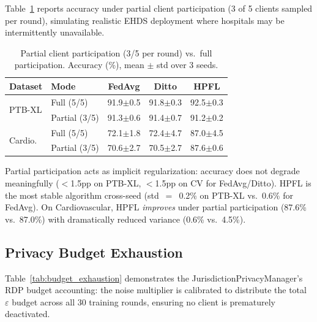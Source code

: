 \documentclass[conference,a4paper]{IEEEtran}
\begin{document}
Table~\ref{tab:partial_participation} reports accuracy under partial client participation (3 of 5 clients sampled per round), simulating realistic EHDS deployment where hospitals may be intermittently unavailable.

\begin{table}[htbp]
\centering
\caption{Partial client participation (3/5 per round) vs.\ full participation. Accuracy (\%), mean $\pm$ std over 3 seeds.}
\label{tab:partial_participation}
\small
\begin{tabular}{llccc}
\toprule
\textbf{Dataset} & \textbf{Mode} & \textbf{FedAvg} & \textbf{Ditto} & \textbf{HPFL} \\
\midrule
\multirow{2}{*}{PTB-XL} & Full (5/5) & 91.9$\pm$0.5 & 91.8$\pm$0.3 & 92.5$\pm$0.3 \\
 & Partial (3/5) & 91.3$\pm$0.6 & 91.4$\pm$0.7 & 91.2$\pm$0.2 \\
\midrule
\multirow{2}{*}{Cardio.} & Full (5/5) & 72.1$\pm$1.8 & 72.4$\pm$4.7 & 87.0$\pm$4.5 \\
 & Partial (3/5) & 70.6$\pm$2.7 & 70.5$\pm$2.7 & 87.6$\pm$0.6 \\
\bottomrule
\end{tabular}

\vspace{1mm}
\footnotesize{Partial participation acts as implicit regularization: accuracy does not degrade meaningfully ($<$1.5pp on PTB-XL, $<$1.5pp on CV for FedAvg/Ditto). HPFL is the most stable algorithm cross-seed (std~$=$~0.2\% on PTB-XL vs.\ 0.6\% for FedAvg). On Cardiovascular, HPFL \textit{improves} under partial participation (87.6\% vs.\ 87.0\%) with dramatically reduced variance (0.6\% vs.\ 4.5\%).}
\end{table}

\subsection{Privacy Budget Exhaustion}
\label{sec:budget_exhaustion}

Table~\ref{tab:budget_exhaustion} demonstrates the JurisdictionPrivacyManager's RDP budget accounting: the noise multiplier is calibrated to distribute the total $\varepsilon$ budget across all 30 training rounds, ensuring no client is prematurely deactivated.
\end{document}
